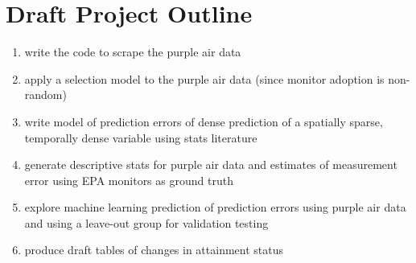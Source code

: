 \documentclass[twocolumn, 12pt]{article}
\begin{document}
\newpage
\section{Draft Project Outline}
\begin{enumerate}
    \item write the code to scrape the purple air data
    \item apply a selection model to the purple air data (since monitor adoption is non-random)
    \item write model of prediction errors of dense prediction of a spatially sparse, temporally dense variable using stats literature
    \item generate descriptive stats for purple air data and estimates of measurement error using EPA monitors as ground truth
    \item explore machine learning prediction of prediction errors using purple air data and using a leave-out group for validation testing
    \item produce draft tables of changes in attainment status
\end{enumerate}


  




\end{document}
